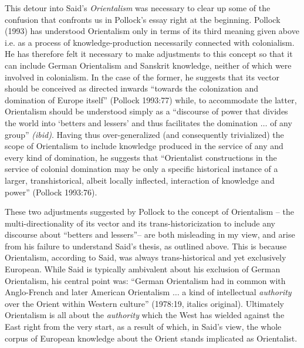 This detour into Said’s {\sl Orientalism} was necessary to clear up some of the confusion that confronts us in Pollock’s essay right at the beginning. Pollock (1993) has understood Orientalism only in terms of its third meaning given above i.e. as a process of knowledge-production necessarily connected with colonialism. He has therefore felt it necessary to make adjustments to this concept so that it can include German Orientalism and Sanskrit knowledge, neither of which were involved in colonialism. In the case of the former, he suggests that its vector should be conceived as directed inwards “towards the colonization and domination of Europe itself” (Pollock 1993:77) while, to accommodate the latter, Orientalism should be understood simply as a “discourse of power that divides the world into ‘betters and lessers’ and thus facilitates the domination $\ldots$ of any group” {\sl (ibid)}. Having thus over-generalized (and consequently trivialized) the scope of Orientalism to include knowledge produced in the service of any and every kind of domination, he suggests that “Orientalist constructions in the service of colonial domination may be only a specific historical instance of a larger, transhistorical, albeit locally inflected, interaction of knowledge and power” (Pollock 1993:76).

These two adjustments suggested by Pollock to the concept of Orientalism – the multi-directionality of its vector and its trans-historicization to include any discourse about “betters and  lessers”– are both misleading in my view, and arise from his failure to understand Said’s thesis, as outlined above. This is because Orientalism, according to Said, was always trans-historical and yet exclusively European. While Said is typically ambivalent about his exclusion of German Orientalism, his central point was: “German Orientalism had in common with Anglo-French and later American Orientalism $\ldots$ a kind of intellectual {\sl authority} over the Orient within Western culture” (1978:19, italics original). Ultimately Orientalism is all about the {\sl authority} which the West has wielded against the East right from the very start, as a result of which, in Said’s view, the whole corpus of European knowledge about the Orient stands implicated as Orientalist. 

